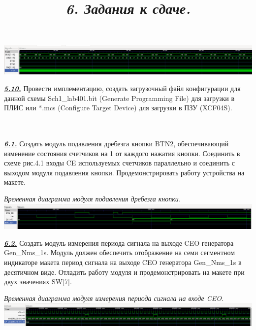 \documentclass[a4paper]{article}
\begin{document}
\begin{center}
	\includegraphics[scale=0.3]{../images/my_counter.png}
\end{center}

\textbf{\textit{\underline{5.10.}}} Провести имплементацию, создать загрузочный файл конфигурации для данной схемы Sch1\_lab401.bit (Generate Programming File) для загрузки в ПЛИС или *.mcs (Configure Target Device) для загрузки в ПЗУ (XCF04S).\\

\title{\large{\textit{6. Задания к сдаче.}}} \\\\

\textbf{\textit{\underline{6.1.}}} Создать модуль подавления дребезга кнопки BTN2, обеспечивающий изменение состояния счетчиков на 1 от каждого нажатия кнопки. Соединить в схеме рис.4.1 входы CE используемых счетчиков параллельно и соединить с выходом модуля подавления кнопки. Продемонстрировать работу устройства на макете.\\

\begin{center}
	\textit{Временная диаграмма модуля подавления дребезга кнопки.}
	\includegraphics[scale=0.3]{../images/BTN_WRP.png}
\end{center}

\textbf{\textit{\underline{6.2.}}} Создать модуль измерения периода сигнала на выходе CEO генератора Gen\_Nms\_1s. Модуль должен обеспечить отображение на семи сегментном индикаторе макета период сигнала на выходе CEO генератора Gen\_Nms\_1s в десятичном виде. Отладить работу модуля и продемонстрировать на макете при двух значениях SW[7].

\begin{center}
	\textit{Временная диаграмма модуля измерения периода сигнала на входе CEO.}
	\includegraphics[scale=0.3]{../images/count_Nms.png}
\end{center}
\end{document}
